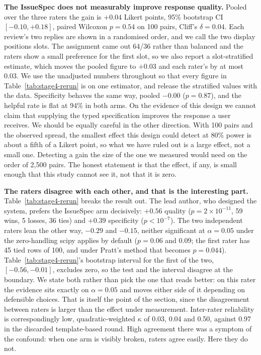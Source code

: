 \documentclass[sigconf, anonymous]{acmart}
\begin{document}
\textbf{The IssueSpec does not measurably improve response quality.} Pooled over the three raters the gain is $+0.04$ Likert points, 95\% bootstrap CI
$[-0.10, +0.18]$, paired Wilcoxon $p = 0.54$ on 100 pairs, Cliff's $\delta = 0.04$. Each review's two replies are shown in a randomised order, and we call the two display positions
slots. The assignment came out 64/36 rather than balanced and the raters show a small preference
for the first slot,
so we also report a slot-stratified estimate, which moves the pooled figure to $+0.03$ and each
rater's by at most 0.03. We use the unadjusted numbers throughout so that every figure in
Table~\ref{tab:stage4-rerun} is on one estimator, and release the stratified values with the
data.
Specificity behaves the same way, pooled $-0.00$ ($p = 0.87$), and the helpful rate is flat at
94\% in both arms. On the evidence of this design we cannot claim that supplying the typed
specification improves the response a user receives. We should be equally careful in the other
direction. With 100 pairs and the observed spread, the smallest effect this design could detect
at 80\% power is about a fifth of a Likert point, so what we have ruled out is a large effect,
not a small one. Detecting a gain the size of the one we measured would need on the order of
2{,}500 pairs. The honest statement is that the effect, if any, is small enough that this study
cannot see it, not that it is zero.

\textbf{The raters disagree with each other, and that is the interesting part.}
Table~\ref{tab:stage4-rerun} breaks the result out. The lead author, who designed the system,
prefers the IssueSpec arm decisively: $+0.56$ quality ($p = 2 \times 10^{-11}$, 59 wins, 5
losses, 36 ties) and $+0.39$ specificity ($p < 10^{-7}$). The two independent raters lean the
other way, $-0.29$ and $-0.15$, neither significant at $\alpha = 0.05$ under the zero-handling
scipy applies by default ($p = 0.06$ and $0.09$; the first rater has 45 tied rows of 100, and
under Pratt's method that becomes $p = 0.044$). Table~\ref{tab:stage4-rerun}'s bootstrap interval
for the first of the two, $[-0.56, -0.01]$, excludes zero, so the test and the interval disagree
at the boundary. We state both rather than pick the one that reads better: on this rater the
evidence sits exactly on $\alpha = 0.05$ and moves either side of it depending on defensible
choices. That is itself the point of the section, since the disagreement between raters is larger
than the effect under measurement.
Inter-rater reliability is correspondingly low, quadratic-weighted $\kappa$ of 0.03, 0.04 and
0.50, against 0.97 in the discarded template-based round. High agreement there was a symptom of
the confound: when one arm is visibly broken, raters agree easily. Here they do not.
\end{document}
